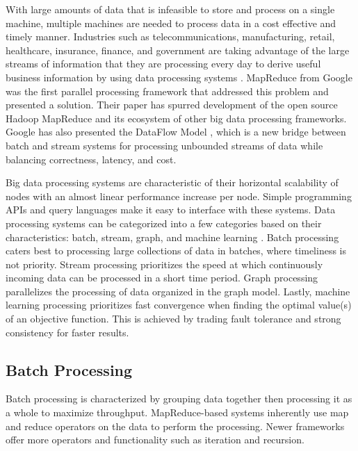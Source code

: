 \documentclass[12pt]{article}
\begin{document}
With large amounts of data that is infeasible to store and process on a single machine, multiple machines are needed to process data in a cost effective and timely manner. Industries such as telecommunications, manufacturing, retail, healthcare, insurance, finance, and government are taking advantage of the large streams of information that they are processing every day to derive useful business information by using data processing systems \cite{ibmbigdataindustries}. MapReduce from Google \cite{dean2008mapreduce} was the first parallel processing framework that addressed this problem and presented a solution. Their paper has spurred development of the open source Hadoop MapReduce \cite{hadoop} and its ecosystem of other big data processing frameworks. Google has also presented the DataFlow Model \cite{akidau2015dataflow}, which is a new bridge between batch and stream systems for processing unbounded streams of data while balancing correctness, latency, and cost.

Big data processing systems are characteristic of their horizontal scalability of nodes with an almost linear performance increase per node. Simple programming APIs and query languages make it easy to interface with these systems. Data processing systems can be categorized into a few categories based on their characteristics: batch, stream, graph, and machine learning \cite{zhang2016survey}. Batch processing caters best to processing large collections of data in batches, where timeliness is not priority. Stream processing prioritizes the speed at which continuously incoming data can be processed in a short time period. Graph processing parallelizes the processing of data organized in the graph model. Lastly, machine learning processing prioritizes fast convergence when finding the optimal value(s) of an objective function. This is achieved by trading fault tolerance and strong consistency for faster results.




\subsection{Batch Processing} \label{sub:batch}

Batch processing is characterized by grouping data together then processing it as a whole to maximize throughput. MapReduce-based systems inherently use map and reduce operators on the data to perform the processing. Newer frameworks offer more operators and functionality such as iteration and recursion.
\end{document}
